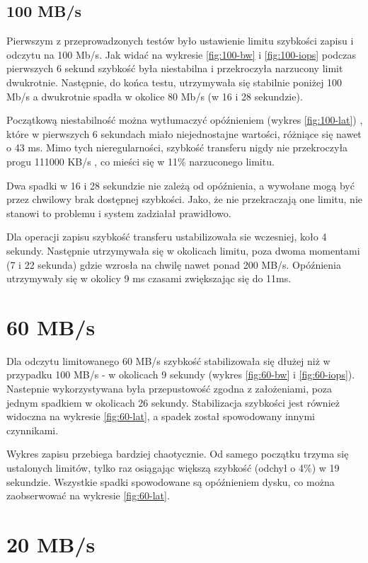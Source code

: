 \subsection{100 MB/s}

Pierwszym z przeprowadzonych testów było ustawienie limitu szybkości zapisu i odczytu
na 100 Mb/s. Jak widać na wykresie \ref{fig:100-bw} i \ref{fig:100-iops}
podczas pierwszych 6 sekund
szybkość była niestabilna i przekroczyła narzucony limit dwukrotnie. Następnie, do końca testu,
utrzymywała się stabilnie poniżej 100 Mb/s a dwukrotnie spadła w okolice 80 Mb/s
(w 16 i 28 sekundzie). 

Początkową niestabilność można wytłumaczyć opóźnieniem (wykres \ref{fig:100-lat})
, które w pierwszych 6 sekundach miało niejednostajne wartości, różniące się nawet o
43 ms. Mimo tych nieregularności, szybkość transferu nigdy nie przekroczyła progu 111000 KB/s , co mieści się w 11\% narzuconego limitu. 

Dwa spadki w 16 i 28 sekundzie nie zależą od opóźnienia, a wywołane mogą być przez
chwilowy brak dostępnej szybkości. Jako, że nie przekraczają one limitu, nie stanowi to problemu
i system zadziałał prawidłowo.

Dla operacji zapisu szybkość transferu ustabilizowała sie wczesniej, koło 4 sekundy. Następnie utrzymywała się w okolicach limitu, poza dwoma momentami
(7 i 22 sekunda) gdzie wzrosła na chwilę nawet ponad 200 MB/s. Opóźnienia  utrzymywały się w okolicy 9 ms czasami zwiększając
się do 11ms.

\section{60 MB/s}

Dla odczytu limitowanego 60 MB/s szybkość stabilizowała się dłużej niż w przypadku 100 MB/s
- w okolicach 9 sekundy (wykres \ref{fig:60-bw} i \ref{fig:60-iops}).
Nastepnie wykorzystywana była przepustowość zgodna z założeniami, poza jednym spadkiem w
okolicach 26 sekundy. Stabilizacja szybkości jest również widoczna na wykresie \ref{fig:60-lat}, a spadek został spowodowany innymi czynnikami.

Wykres zapisu przebiega bardziej
chaotycznie. Od samego początku trzyma się ustalonych limitów, tylko raz osiągając
większą szybkość (odchył o 4\%) w 19 sekundzie. Wszystkie spadki spowodowane są opóźnieniem
dysku, co można zaobserwować na wykresie \ref{fig:60-lat}.

\section{20 MB/s}

